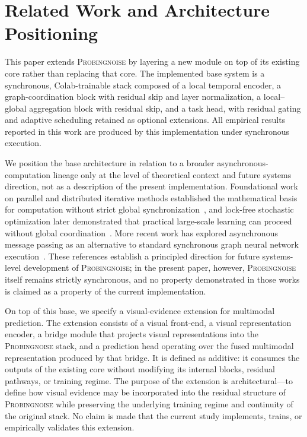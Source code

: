 \section{Related Work and Architecture Positioning}
\label{sec:positioning}

This paper extends \textsc{Probingnoise} by layering a new module on top of its existing core rather than replacing that core. The implemented base system is a synchronous, Colab-trainable stack composed of a local temporal encoder, a graph-coordination block with residual skip and layer normalization, a local--global aggregation block with residual skip, and a task head, with residual gating and adaptive scheduling retained as optional extensions. All empirical results reported in this work are produced by this implementation under synchronous execution.

We position the base architecture in relation to a broader asynchronous-computation lineage only at the level of theoretical context and future systems direction, not as a description of the present implementation. Foundational work on parallel and distributed iterative methods established the mathematical basis for computation without strict global synchronization~\citep{bertsekas1989parallel}, and lock-free stochastic optimization later demonstrated that practical large-scale learning can proceed without global coordination~\citep{niu2011hogwild}. More recent work has explored asynchronous message passing as an alternative to standard synchronous graph neural network execution~\citep{faber2022async,faber2024gwac}. These references establish a principled direction for future systems-level development of \textsc{Probingnoise}; in the present paper, however, \textsc{Probingnoise} itself remains strictly synchronous, and no property demonstrated in those works is claimed as a property of the current implementation.

On top of this base, we specify a visual-evidence extension for multimodal prediction. The extension consists of a visual front-end, a visual representation encoder, a bridge module that projects visual representations into the \textsc{Probingnoise} stack, and a prediction head operating over the fused multimodal representation produced by that bridge. It is defined as additive: it consumes the outputs of the existing core without modifying its internal blocks, residual pathways, or training regime. The purpose of the extension is architectural---to define how visual evidence may be incorporated into the residual structure of \textsc{Probingnoise} while preserving the underlying training regime and continuity of the original stack. No claim is made that the current study implements, trains, or empirically validates this extension.

